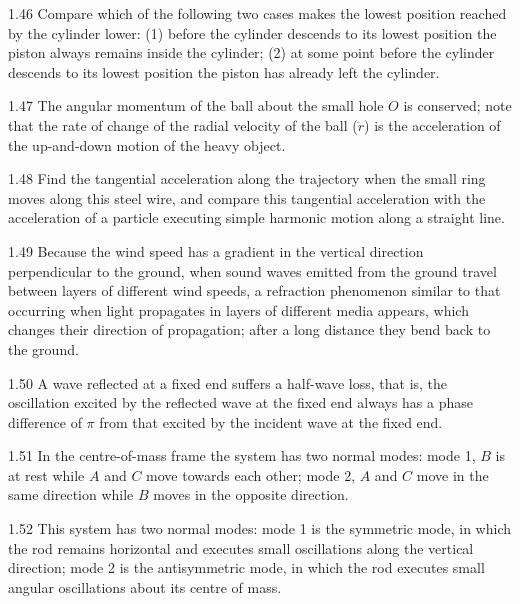 \begin{hint}{1.46}
Compare which of the following two cases makes the lowest position reached by the cylinder lower: (1) before the cylinder descends to its lowest position the piston always remains inside the cylinder; (2) at some point before the cylinder descends to its lowest position the piston has already left the cylinder.
\end{hint}

\begin{hint}{1.47}
The angular momentum of the ball about the small hole $O$ is conserved; note that the rate of change of the radial velocity of the ball ($\ddot{r}$) is the acceleration of the up-and-down motion of the heavy object.
\end{hint}

\begin{hint}{1.48}
Find the tangential acceleration along the trajectory when the small ring moves along this steel wire, and compare this tangential acceleration with the acceleration of a particle executing simple harmonic motion along a straight line.
\end{hint}

\begin{hint}{1.49}
Because the wind speed has a gradient in the vertical direction perpendicular to the ground, when sound waves emitted from the ground travel between layers of different wind speeds, a refraction phenomenon similar to that occurring when light propagates in layers of different media appears, which changes their direction of propagation; after a long distance they bend back to the ground.
\end{hint}

\begin{hint}{1.50}
A wave reflected at a fixed end suffers a half-wave loss, that is, the oscillation excited by the reflected wave at the fixed end always has a phase difference of $\pi$ from that excited by the incident wave at the fixed end.
\end{hint}

\begin{hint}{1.51}
In the centre-of-mass frame the system has two normal modes: mode 1, $B$ is at rest while $A$ and $C$ move towards each other; mode 2, $A$ and $C$ move in the same direction while $B$ moves in the opposite direction.
\end{hint}

\begin{hint}{1.52}
This system has two normal modes: mode 1 is the symmetric mode, in which the rod remains horizontal and executes small oscillations along the vertical direction; mode 2 is the antisymmetric mode, in which the rod executes small angular oscillations about its centre of mass.
\end{hint}

